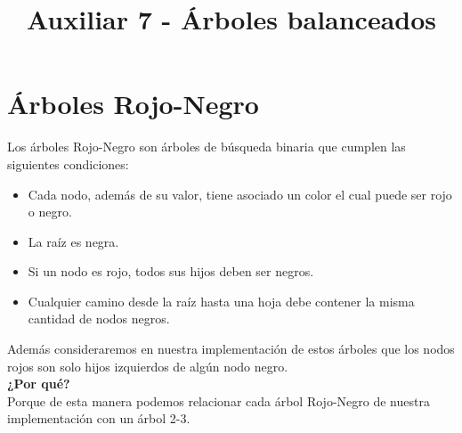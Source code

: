 \documentclass[dcc,sol]{fcfmcourse}
\title{Auxiliar 7 - Árboles balanceados}
\begin{document}
\maketitle

\vspace{-1ex}


\section*{Árboles Rojo-Negro}
Los árboles Rojo-Negro son árboles de búsqueda binaria que cumplen las siguientes condiciones:
\begin{itemize}
    \item Cada nodo, además de su valor, tiene asociado un color el cual puede ser rojo o negro.
    \item La raíz es negra.
    \item Si un nodo es rojo, todos sus hijos deben ser negros.
    \item Cualquier camino desde la raíz hasta una hoja debe contener la misma cantidad de nodos negros.
\end{itemize}
Además consideraremos en nuestra implementación de estos árboles que los nodos rojos son solo hijos izquierdos de algún nodo negro.\\

\textbf{¿Por qué?}\\
Porque de esta manera podemos relacionar cada árbol Rojo-Negro de nuestra implementación con un árbol 2-3.\\
\end{document}
